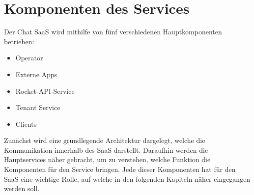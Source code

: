 \chapter{Komponenten des Services}
\label{chap:komponenten}

Der Chat \ac{SaaS} wird mithilfe von fünf verschiedenen Hauptkomponenten betrieben:
\begin{itemize}
  \item Operator
  \item Externe Apps
  \item Rocket-API-Service
  \item Tenant Service
  \item Clients
\end{itemize}

Zunächst wird eine grundlegende Architektur dargelegt, welche die Kommunikation innerhalb des \ac{SaaS} darstellt.
Daraufhin werden die Hauptservices näher gebracht, um zu verstehen, welche Funktion die Komponenten für den Service bringen.
Jede dieser Komponenten hat für den \ac{SaaS} eine wichtige Rolle, auf welche in den folgenden Kapiteln näher eingegangen werden soll.